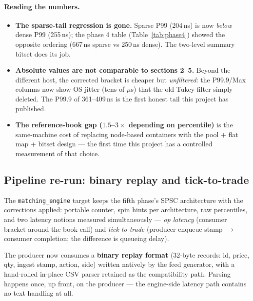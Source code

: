 \documentclass[11pt,a4paper]{article}
\begin{document}
\paragraph{Reading the numbers.}
\begin{itemize}
\item \textbf{The sparse-tail regression is gone.} Sparse P99 (204\,ns) is
      now \emph{below} dense P99 (255\,ns); the phase 4 table
      (Table~\ref{tab:phase4}) showed the opposite ordering (667\,ns sparse
      vs 250\,ns dense). The two-level summary bitset does its job.
\item \textbf{Absolute values are not comparable to sections 2--5.} Beyond
      the different host, the corrected bracket is cheaper but
      \emph{unfiltered}: the P99.9/Max columns now show OS jitter
      (tens of $\mu$s) that the old Tukey filter simply deleted. The P99.9
      of 361--409\,ns is the first honest tail this project has published.
\item \textbf{The reference-book gap ($1.5$--$3\times$ depending on
      percentile)} is the same-machine cost of replacing node-based
      containers with the pool + flat map + bitset design --- the first
      time this project has a controlled measurement of that choice.
\end{itemize}

\subsection{Pipeline re-run: binary replay and tick-to-trade}

The \texttt{matching\_engine} target keeps the fifth phase's SPSC
architecture with the corrections applied: portable counter, spin hints per
architecture, raw percentiles, and two latency notions measured
simultaneously --- \emph{op latency} (consumer bracket around the book call)
and \emph{tick-to-trade} (producer enqueue stamp $\to$ consumer completion;
the difference is queueing delay).

The producer now consumes a \textbf{binary replay format} (32-byte records:
id, price, qty, ingest stamp, action, side) written natively by the feed
generator, with a hand-rolled in-place CSV parser retained as the
compatibility path. Parsing happens once, up front, on the producer --- the
engine-side latency path contains no text handling at all.
\end{document}
